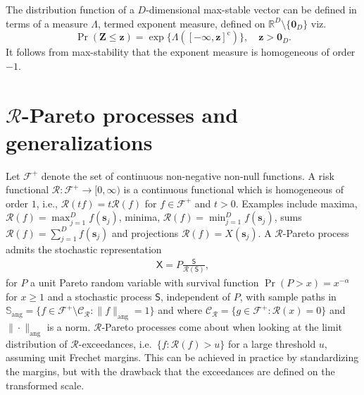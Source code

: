 \documentclass[]{book}
\begin{document}
The distribution function of a \(D\)-dimensional max-stable vector can be defined in terms of a measure \(\Lambda\), termed exponent measure, defined on \(\mathbb{R}^D \setminus\{\boldsymbol{0}_D\}\) viz.
\[\Pr(\boldsymbol{Z} \leq \boldsymbol{z}) = \exp\{\Lambda([-\boldsymbol{\infty}, \boldsymbol{z}]^\mathrm{c})\}, \quad \boldsymbol{z} > \boldsymbol{0}_D.\]
It follows from max-stability that the exponent measure is homogeneous of order \(-1\).

\hypertarget{mathcalr-pareto-processes-and-generalizations}{%
\section{\texorpdfstring{\(\mathcal{R}\)-Pareto processes and generalizations}{\textbackslash mathcal\{R\}-Pareto processes and generalizations}}\label{mathcalr-pareto-processes-and-generalizations}}

Let \(\mathcal{F}^+\) denote the set of continuous non-negative non-null functions. A risk functional \(\mathcal{R}:\mathcal{F}^+ \to [0, \infty)\) is a continuous functional which is homogeneous of order \(1\), i.e., \(\mathcal{R}(tf) = t\mathcal{R}(f)\) for \(f \in \mathcal{F}^+\) and \(t>0\). Examples include maxima, \(\mathcal{R}(f) = \max_{j=1}^D f(\boldsymbol{s}_j)\), minima, \(\mathcal{R}(f) = \min_{j=1}^D f(\boldsymbol{s}_j)\), sums
\(\mathcal{R}(f) = \sum_{j=1}^D f(\boldsymbol{s}_j)\) and projections \(\mathcal{R}(f) = X(\boldsymbol{s}_j)\). A \(\mathcal{R}\)-Pareto process admits the stochastic representation \citep{Ferreira:2014}\citep{Dombry/Ribatet:2015}
\begin{align}
  \mathsf{X} = P \frac{\mathsf{S}}{\mathcal{R}(\mathsf{S})},
 \end{align}
for \(P\) a unit Pareto random variable with survival function \(\Pr(P>x) = x^{-\alpha}\) for \(x \geq 1\) and a stochastic process \(\mathsf{S}\), independent of \(P\), with sample paths in \(\mathbb{S}_{\mathrm{ang}} = \{f \in \mathcal{F}^+ \setminus \mathcal{C}_{\mathcal{R}}: \|f\|_{\mathrm{ang}} = 1\}\) and where \(\mathcal{C}_{\mathcal{R}} = \{g \in \mathcal{F}^+: \mathcal{R}(x)=0\}\) and \(\|\cdot\|_{\mathrm{ang}}\) is a norm. \(\mathcal{R}\)-Pareto processes come about when looking at the limit distribution of \(\mathcal{R}\)-exceedances, i.e.~\(\{f: \mathcal{R}(f) >u\}\) for a large threshold \(u\), assuming unit Frechet margins. This can be achieved in practice by standardizing the margins, but with the drawback that the exceedances are defined on the transformed scale.
\end{document}
